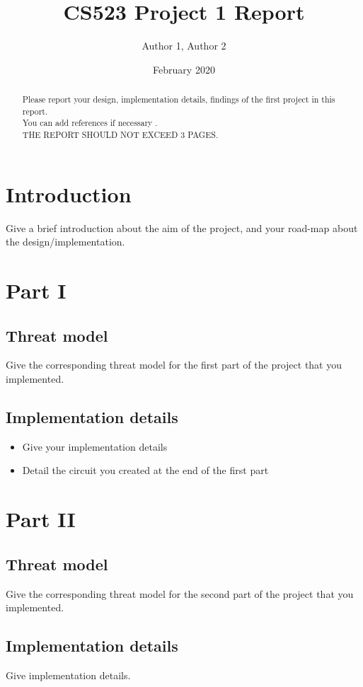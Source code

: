 \documentclass[10pt,conference,compsocconf]{IEEEtran}
\title{CS523 Project 1 Report}
\author{Author 1, Author 2}
\date{February 2020}
\begin{document}
\maketitle

\begin{abstract}
    Please report your design, implementation details, findings of the first project in this report. \\
    You can add references if necessary \cite{article}. \\
    THE REPORT SHOULD NOT EXCEED 3 PAGES.
\end{abstract}
\section{Introduction}
Give a brief introduction about the aim of the project, and your road-map about the design/implementation.
\section{Part I}

\subsection{Threat model}
Give the corresponding threat model for the first part of the project that you implemented. 
\subsection{Implementation details}
\begin{itemize}
    \item Give your implementation details
    \item Detail the circuit you created at the end of the first part
\end{itemize}
\section{Part II}
\subsection{Threat model}
Give the corresponding threat model for the second part of the project that you implemented. 
\subsection{Implementation details}
Give implementation details.
\end{document}
